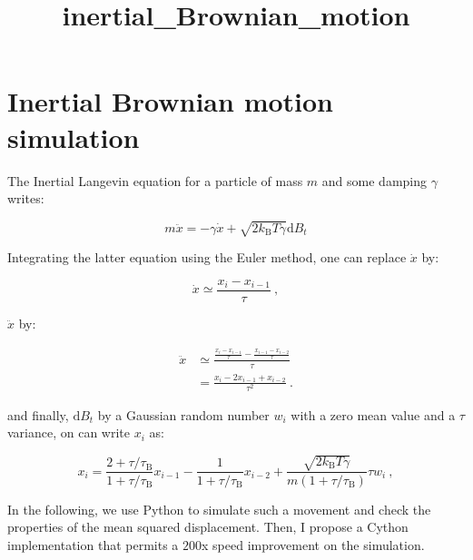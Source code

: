 \documentclass[11pt]{article}
\title{inertial\_Brownian\_motion}
\begin{document}
    
    \maketitle
    
    

    
    \hypertarget{inertial-brownian-motion-simulation}{%
\section{Inertial Brownian motion
simulation}\label{inertial-brownian-motion-simulation}}

The Inertial Langevin equation for a particle of mass \(m\) and some
damping \(\gamma\) writes:

\begin{equation}
m\ddot{x} = -\gamma \dot{x} + \sqrt{2k_\mathrm{B}T \gamma} \mathrm{d}B_t
\end{equation}

Integrating the latter equation using the Euler method, one can replace
\(\dot{x}\) by:

\begin{equation}
\dot{x} \simeq \frac{x_i - x_{i-1}}{\tau} ~,
\end{equation}

\(\ddot{x}\) by:

\begin{equation}
    \begin{aligned}
    \ddot{x} &\simeq 
    \frac{
        \frac{x_i - x_{i-1}}{\tau}
        -
        \frac{x_{i-1} - x_{i-2}}{\tau}
    }
    {\tau} \\
    & =  \frac{x_i - 2x_{i - 1} + x_{i-2}}{\tau^2} ~.
    \end{aligned}
\end{equation}

and finally, \(\mathrm{d}B_t\) by a Gaussian random number \(w_i\) with
a zero mean value and a \(\tau\) variance, on can write \(x_i\) as:

\begin{equation}    
    x_i = \frac{2 + \tau /\tau_\mathrm{B}}{1 + \tau / \tau_\mathrm{B} } x_{i-1} 
    - \frac{1}{1 + \tau / \tau_\mathrm{B}}x_{i-2}
    + \frac{\sqrt{2k_\mathrm{B}T\gamma}}{m(1 + \tau/\tau_\mathrm{B})} \tau w_i ~,
\end{equation}

In the following, we use Python to simulate such a movement and check
the properties of the mean squared displacement. Then, I propose a
Cython implementation that permits a \(200\)x speed improvement on the
simulation.
\end{document}
